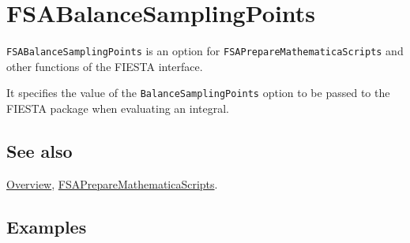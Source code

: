 \documentclass[../FeynHelpersManual.tex]{subfiles}
\begin{document}
\begin{Shaded}
\begin{Highlighting}[]
 
\end{Highlighting}
\end{Shaded}

\hypertarget{fsabalancesamplingpoints}{
\section{FSABalanceSamplingPoints}\label{fsabalancesamplingpoints}}

\texttt{FSABalanceSamplingPoints} is an option for
\texttt{FSAPrepareMathematicaScripts} and other functions of the FIESTA
interface.

It specifies the value of the \texttt{BalanceSamplingPoints} option to
be passed to the FIESTA package when evaluating an integral.

\subsection{See also}

\hyperlink{toc}{Overview},
\hyperlink{fsapreparemathematicascripts}{FSAPrepareMathematicaScripts}.

\subsection{Examples}
\end{document}
